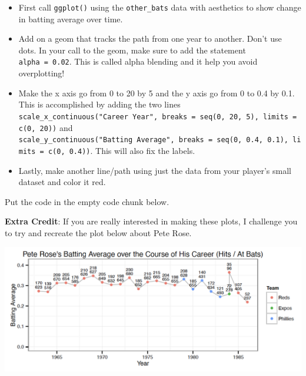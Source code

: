 \documentclass[
]{article}
\providecommand{\tightlist}{%
  \setlength{\itemsep}{0pt}\setlength{\parskip}{0pt}}
\begin{document}
\begin{itemize}
\tightlist
\item
  First call \texttt{ggplot()} using the \texttt{other\_bats} data with
  aesthetics to show change in batting average over time.
\item
  Add on a geom that tracks the path from one year to another. Don't use
  dots. In your call to the geom, make sure to add the statement
  \texttt{alpha\ =\ 0.02}. This is called alpha blending and it help you
  avoid overplotting!
\item
  Make the x axis go from 0 to 20 by 5 and the y axis go from 0 to 0.4
  by 0.1. This is accomplished by adding the two lines
  \texttt{scale\_x\_continuous("Career\ Year",\ breaks\ =\ seq(0,\ 20,\ 5),\ limits\ =\ c(0,\ 20))}
  and
  \texttt{scale\_y\_continuous("Batting\ Average",\ breaks\ =\ seq(0,\ 0.4,\ 0.1),\ limits\ =\ c(0,\ 0.4))}.
  This will also fix the labels.
\item
  Lastly, make another line/path using just the data from your player's
  small dataset and color it red.
\end{itemize}

Put the code in the empty code chunk below.

\textbf{Extra Credit}: If you are really interested in making these
plots, I challenge you to try and recreate the plot below about Pete
Rose.

\includegraphics{img/pete_rose_pic.png}
\end{document}

